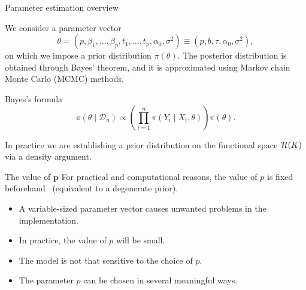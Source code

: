 \documentclass[9pt, english, professionalfonts]{beamer}
\newcommand\maroon[1]{\color{mLightBrown}#1\color{mDarkTeal}}
\newcommand{\D} {\ensuremath{\mathcal{D}}}
\newcommand{\Hcal} {\ensuremath\mathcal{H}}
\begin{document}
\begin{frame}{Parameter estimation overview}

  We consider a parameter vector
  \[
  \theta = (p, \beta_1,\dots, \beta_p, t_1,\dots, t_p, \alpha_0, \sigma^2) \equiv (p, b, \tau, \alpha_0, \sigma^2),
  \]
  on which we impose a prior distribution \(\pi(\theta)\). The posterior distribution is obtained through Bayes' theorem, and it is approximated using Markov chain Monte Carlo (MCMC) methods.

  \vspace{1em}

      \begin{block}{Bayes's formula}
      \[
      \pi(\theta \mid \D_n) \propto \left( \prod_{i=1}^n \pi(Y_i\mid X_i, \theta) \right)\pi(\theta).
      \]
  \end{block}

  \vspace{1em}

  In practice we are establishing a prior distribution on the functional space \(\Hcal(K)\) via a density argument.

\end{frame}

\begin{frame}{The value of \(\bm p\)}
    For practical and computational reasons, \maroon{the value of \(p\) is fixed beforehand} \ (equivalent to a degenerate prior).

    \begin{itemize}
      \item A variable-sized parameter vector causes unwanted problems in the implementation.
      \item In practice, the value of \(p\) will be small.
      \item The model is not that sensitive to the choice of \(p\).
      \item The parameter \(p\) can be chosen in several meaningful ways.
    \end{itemize}
\end{frame}
\end{document}
